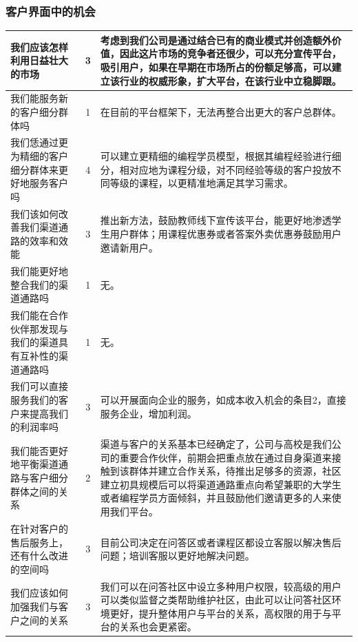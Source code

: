 \documentclass[a4paper]{ctexart}
\begin{document}
\subsubsection{客户界面中的机会}
\begin{table}[h]
  \centering
\begin{tabular}{|p{3.5cm}|c|p{10cm}|}
  \hline
  我们应该怎样利用日益壮大的市场 & 3 & 考虑到我们公司是通过结合已有的商业模式并创造额外价值，因此这片市场的竞争者还很少，可以充分宣传平台，吸引用户，如果在早期在市场所占的份额足够高，可以建立该行业的权威形象，扩大平台，在该行业中立稳脚跟。\\
  \hline
  我们能服务新的客户细分群体吗 & 1 & 在目前的平台框架下，无法再整合出更大的客户总群体。\\
  \hline
  我们恁通过更为精细的客户细分群体来更好地服务客户吗 & 4 & 可以建立更精细的编程学员模型，根据其编程经验进行细分，相对应地为课程分级，对不同经验等级的客户投放不同等级的课程，以更精准地满足其学习需求。\\
  \hline
  我们该如何改善我们渠道通路的效率和效能 & 3 & 推出新方法，鼓励教师线下宣传该平台，能更好地渗透学生用户群体；用课程优惠券或者答案外卖优惠券鼓励用户邀请新用户。\\
  \hline
  我们能更好地整合我们的渠道通路吗 & 1 & 无。\\
  \hline
  我们能在合作伙伴那发现与我们的渠道具有互补性的渠道通路吗 & 1 & 无。\\
  \hline
  我们可以直接服务我们的客户来提高我们的利润率吗 & 3 & 可以开展面向企业的服务，如成本收入机会的条目2，直接服务企业，增加利润。\\
  \hline
  我们能否更好地平衡渠道通路与客户细分群体之间的关系 & 2 & 渠道与客户的关系基本已经确定了，公司与高校是我们公司的重要合作伙伴，前期会把重点放在通过自身渠道来接触到该群体并建立合作关系，待推出足够多的资源，社区建立初具规模后可以将渠道通路重点向希望兼职的大学生或者编程学员方面倾斜，并且鼓励他们邀请更多的人来使用我们平台。\\
  \hline
  在针对客户的售后服务上，还有什么改进的空间吗 & 3 & 目前公司决定在问答区或者课程区都设立客服以解决售后问题；培训客服以更好地解决问题。\\
  \hline
  我们应该如何加强我们与客户之间的关系 & 3 & 我们可以在问答社区中设立多种用户权限，较高级的用户可以类似监督之类帮助维护社区，由此可以让问答社区环境更好，提升整体用户与平台的关系，高权限的用于与平台的关系也会更紧密。\\
  \hline
\end{tabular}
\end{table}
\end{document}
